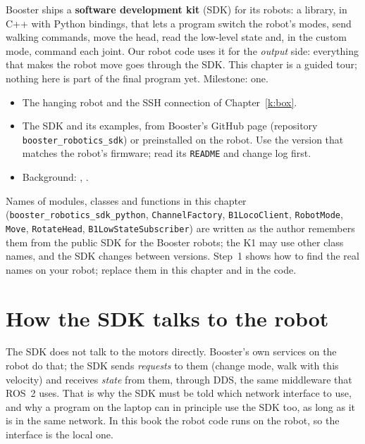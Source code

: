 \label{k:sdk}

Booster ships a \textbf{software development kit} (SDK) for its robots: a library, in C++ with Python bindings, that lets a program switch the robot's modes, send walking commands, move the head, read the low-level state and, in the custom mode, command each joint. Our robot code uses it for the \emph{output} side: everything that makes the robot move goes through the SDK. This chapter is a guided tour; nothing here is part of the final program yet. Milestone: one.

\begin{needbox}
\begin{itemize}[nosep]
  \item The hanging robot and the SSH connection of Chapter~\ref{k:box}.
  \item The SDK and its examples, from Booster's GitHub page (repository \texttt{booster\_robotics\_sdk}\guess) or preinstalled on the robot\guess. Use the version that matches the robot's firmware; read its \texttt{README} and change log first.
  \item Background: , .
\end{itemize}
\end{needbox}

\begin{guessbox}
Names of modules, classes and functions in this chapter (\texttt{booster\_robotics\_sdk\_python}, \texttt{ChannelFactory}, \texttt{B1LocoClient}, \texttt{RobotMode}, \texttt{Move}, \texttt{RotateHead}, \texttt{B1LowStateSubscriber}) are written as the author remembers them from the public SDK for the Booster robots; the K1 may use other class names, and the SDK changes between versions. Step~1 shows how to find the real names on your robot; replace them in this chapter and in the code.
\end{guessbox}

\section*{How the SDK talks to the robot}
The SDK does not talk to the motors directly. Booster's own services on the robot do that; the SDK sends \emph{requests} to them (change mode, walk with this velocity) and receives \emph{state} from them, through DDS, the same middleware that ROS~2 uses. That is why the SDK must be told which network interface to use, and why a program on the laptop can in principle use the SDK too, as long as it is in the same network. In this book the robot code runs on the robot, so the interface is the local one.

